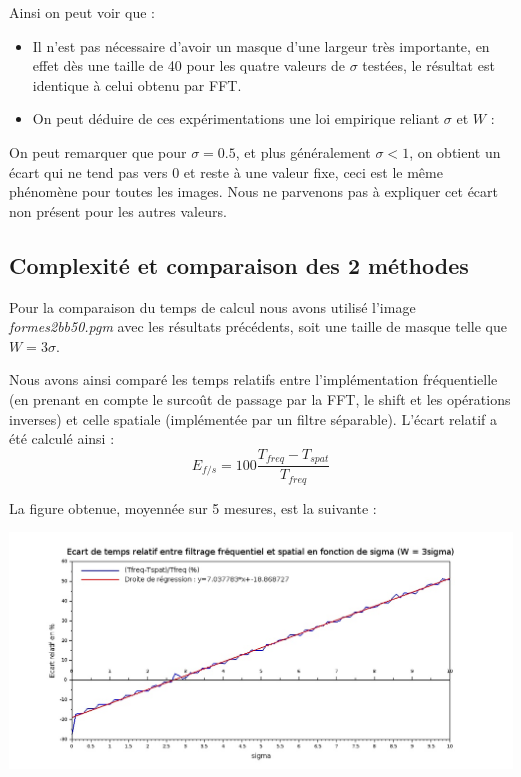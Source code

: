 \documentclass[a4,12pt]{article}
\begin{document}
\noindent
Ainsi on peut voir que :
\begin{itemize}
	\item Il n'est pas nécessaire d'avoir un masque d'une largeur très importante, en effet dès une taille de 40 pour les quatre valeurs de $\sigma$ testées, le résultat est identique à celui obtenu par FFT.
	\item On peut déduire de ces expérimentations une loi empirique reliant $\sigma$ et $W$ :\\
	\begin{center}
	\end{center}
\end{itemize}

\vspace{1em}
On peut remarquer que pour $\sigma=0.5$, et plus généralement $\sigma < 1$, on obtient un écart qui ne tend pas vers $0$ et reste à une valeur fixe, ceci est le même phénomène pour toutes les images. Nous ne parvenons pas à expliquer cet écart non présent pour les autres valeurs.

\subsection{Complexité et comparaison des 2 méthodes}
Pour la comparaison du temps de calcul nous avons utilisé l'image \textit{formes2bb50.pgm} avec les résultats précédents, soit une taille de masque telle que $W=3\sigma$.

Nous avons ainsi comparé les temps relatifs entre l'implémentation fréquentielle (en prenant en compte le surcoût de passage par la FFT, le shift et les opérations inverses) et celle spatiale (implémentée par un filtre séparable). L'écart relatif a été calculé ainsi :\\

\begin{equation}
E_{f/s}=100\frac{T_{freq}-T_{spat}}{T_{freq}}
\end{equation}

La figure obtenue, moyennée sur 5 mesures, est la suivante :
\begin{center}
	\includegraphics[width = 170mm]{./img/timeDiff.jpg}
\end{center}
\end{document}
